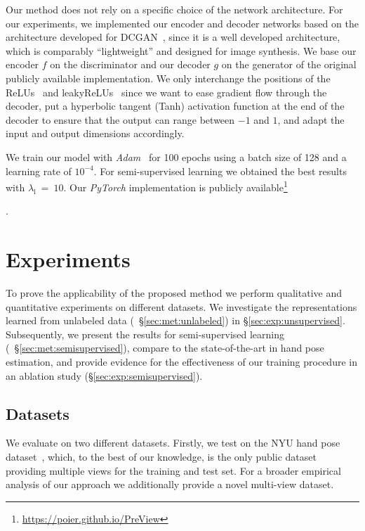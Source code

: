 \documentclass[10pt,twocolumn,letterpaper]{article}
\begin{document}
Our method does not rely on a specific choice of the network architecture.
For our experiments, we implemented our encoder and decoder 
networks based on the architecture developed for DCGAN~\cite{Radford2016iclr_dcgan},
since it is a well developed architecture, which is comparably ``lightweight'' and 
designed for image synthesis.
We base our encoder $f$ on the discriminator and our decoder $g$ on the generator of 
the original publicly available 
implementation.
We only interchange the positions of the ReLUs~\cite{Fukushima1980biolcybernetics_neocognitron} 
and leakyReLUs~\cite{Maas13icml_rectifiernonlinearities} since we want 
to ease gradient flow through the decoder, put a hyperbolic tangent (Tanh) activation 
function at the end of the decoder to ensure that the output can range between $-1$ and $1$,
and adapt the input and output dimensions accordingly.

We train our model with \emph{Adam}~\cite{Kingma2015iclr_adam} for 100 epochs
using a batch size of 128 and a learning rate of $10^{-4}$.
For semi-supervised learning we obtained the best results with $\lambda_{\mathrm{l}}~=~10$.
Our \emph{PyTorch} implementation is publicly 
available\footnote{\url{https://poier.github.io/PreView}}\addtocounter{footnote}{-1}\addtocounter{Hfootnote}{-1}.



\section{Experiments}
To prove the applicability of the proposed method
we perform qualitative and quantitative experiments on different datasets.
We investigate the representations learned from unlabeled data (\cf~\S\ref{sec:met:unlabeled})
in \S\ref{sec:exp:unsupervised}. 
Subsequently, we present the results for 
semi-supervised learning (\cf~\S\ref{sec:met:semisupervised}),
compare to the state-of-the-art in hand pose estimation, and
provide evidence for the effectiveness of our training procedure in an ablation study 
(\S\ref{sec:exp:semisupervised}).

\subsection{Datasets}\label{sec:exp:datasets}

We evaluate on two different datasets.
Firstly, we test on the NYU hand pose dataset~\cite{Tompson2014tog},
which, to the best of our knowledge, is the only public dataset 
providing multiple views for the training and test set.
For a broader empirical analysis of our approach we additionally 
provide a novel multi-view dataset\footnotemark.
\end{document}
